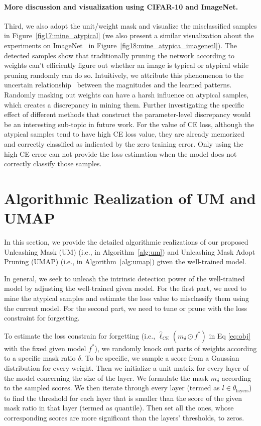 \documentclass{article}
\theoremstyle{plain}
\theoremstyle{definition}
\theoremstyle{remark}
\begin{document}
\paragraph{More discussion and visualization using CIFAR-10 and ImageNet.} Third, we also adopt the unit/weight mask \citep{han2015deep} and visualize the misclassified samples in Figure~\ref{fig17:mine_atypical} (we also present a similar visualization about the experiments on ImageNet~\citep{deng2009imagenet} in Figure~\ref{fig18:mine_atypica_imagenetl}). The detected samples show that traditionally pruning the network according to weights can't efficiently figure out whether an image is typical or atypical while pruning randomly can do so. Intuitively, we attribute this phenomenon to the uncertain relationship~\citep{gal2016dropout} between the magnitudes and the learned patterns. Randomly masking out weights can have a harsh influence on atypical samples, which creates a discrepancy in mining them. Further investigating the specific effect of different methods that construct the parameter-level discrepancy would be an interesting sub-topic in future work. For the value of CE loss, although the atypical samples tend to have high CE loss value, they are already memorized and correctly classified as indicated by the zero training error. Only using the high CE error can not provide the loss estimation when the model does not correctly classify those samples. 


\clearpage
\section{Algorithmic Realization of UM and UMAP}
\label{app:algo_realization}

In this section, we provide the detailed algorithmic realizations of our proposed Unleashing Mask (UM) (i.e., in Algorithm~\ref{alg:um}) and Unleashing Mask Adopt Pruning (UMAP) (i.e., in Algorithm~\ref{alg:umap}) given the well-trained model. 

In general, we seek to unleash the intrinsic detection power of the well-trained model by adjusting the well-trained given model. For the first part, we need to mine the atypical samples and estimate the loss value to misclassify them using the current model. For the second part, we need to tune or prune with the loss constraint for forgetting.

To estimate the loss constrain for forgetting (i.e., $\widehat{\ell}_\text{CE}(m_\delta\odot f^*)$ in Eq \ref{eq:obj} with the fixed given model $f^*$), we randomly knock out parts of weights according to a specific mask ratio $\delta$. To be specific, we sample a score from a Gaussian distribution for every weight. Then we initialize a unit matrix for every layer of the model concerning the size of the layer. We formulate the mask $m_\delta$ according to the sampled scores. We then iterate through every layer (termed as $l \in \theta_\text{layers}$) to find the threshold for each layer that is smaller than the score of the given mask ratio in that layer (termed as $\text{quantile}$). Then set all the ones, whose corresponding scores are more significant than the layers' thresholds, to zeros. 
\end{document}
